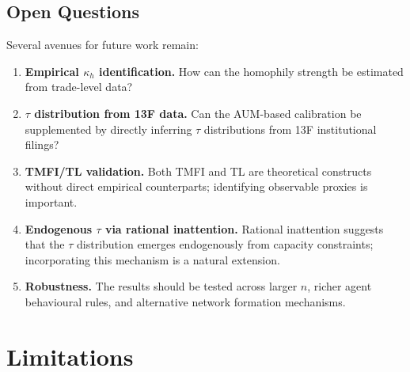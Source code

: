 \documentclass[10pt,twocolumn]{article}
\begin{document}
\subsection{Open Questions}

Several avenues for future work remain:
\begin{enumerate}
  \item \textbf{Empirical $\kappa_h$ identification.}
        How can the homophily strength be estimated from trade-level data?
  \item \textbf{$\tau$ distribution from 13F data.}
        Can the AUM-based calibration be supplemented by directly inferring
        $\tau$ distributions from 13F institutional filings?
  \item \textbf{TMFI/TL validation.}
        Both TMFI and TL are theoretical constructs without direct
        empirical counterparts; identifying observable proxies is important.
  \item \textbf{Endogenous $\tau$ via rational inattention.}
        Rational inattention \cite{sims2003} suggests that the
        $\tau$ distribution emerges endogenously from capacity constraints;
        incorporating this mechanism is a natural extension.
  \item \textbf{Robustness.}
        The results should be tested across larger $n$, richer agent
        behavioural rules, and alternative network formation mechanisms.
\end{enumerate}

\section{Limitations}
\label{sec:limitations}
\end{document}
